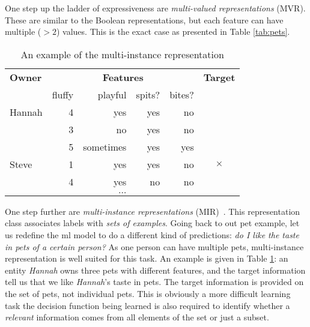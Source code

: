 One step up the ladder of expressiveness are \textit{multi-valued representations} (MVR).
These are similar to the Boolean representations, but each feature can have multiple ($> 2$) values.
This is the exact case as presented in Table \ref{tab:pets}.


\begin{table}
	\centering
	\caption{An example of the multi-instance representation\label{tab:mi}}
		\begin{tabular}{@{}lrrrrc@{}}
		\toprule
		\textbf{Owner} 	& \multicolumn{4}{c}{\textbf{Features}} 		& \textbf{Target} \\
			\cmidrule{2-5}
						& fluffy		& playful	& spits?		& bites?& 	\\
			\midrule

		Hannah			& 4			& yes		& yes		& no		& \checkmark \\
						& 3			& no			& yes		& no		&  \\
						& 5			& sometimes & yes		& yes	& \\
		\midrule
		Steve			& 1			& yes		& yes		& no		& $\mathbf{\times}$  \\
						& 4			& yes		& no			& no		& 	\\
		\midrule
		\multicolumn{6}{c}{$\ldots$} \\
		\bottomrule

		\end{tabular}
\end{table}



One step further are \textit{multi-instance representations} (MIR)~\cite{Dietterich:1997:SMI:249678.249682}.
This representation class associates labels with \textit{sets of examples}.
Going back to out pet example, let us redefine the \gls{ml} model to do a different kind of predictions: \textit{do I like the taste in pets of a certain person?}
As one person can have multiple pets, multi-instance representation is well suited for this task.
An example is given in Table \ref{tab:mi}: an entity \textit{Hannah} owns three pets with different features, and the target information tell us that we like \textit{Hannah}'s taste in pets.
The target information is provided on the set of pets, not individual pets.
This is obviously a more difficult learning task the decision function being learned is also required to identify whether a \textit{relevant} information comes from all elements of the set or just a subset.







